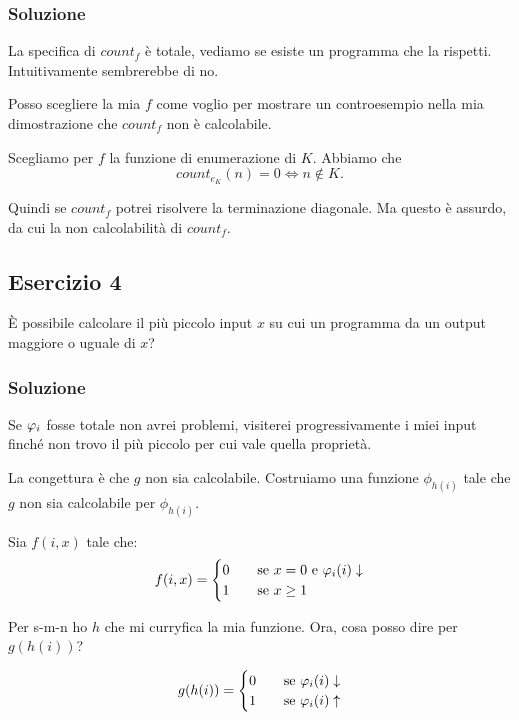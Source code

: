 \subsubsection{Soluzione}

La specifica di $\textit{count}_{f}$ è totale, vediamo se esiste un programma che la rispetti.
Intuitivamente sembrerebbe di no.

Posso scegliere la mia $f$ come voglio per mostrare un controesempio nella mia dimostrazione che
$\textit{count}_{f}$ non è calcolabile.

Scegliamo per $f$ la funzione di enumerazione di $K$. Abbiamo che
\begin{equation*}
    count_{e_{K}}(n) = 0 \iff n \notin K.
\end{equation*}

Quindi se $\textit{count}_{f}$ potrei risolvere la terminazione diagonale. Ma questo è assurdo, da
cui la non calcolabilità di $\textit{count}_{f}$.

\subsection{Esercizio 4}

È possibile  calcolare  il  più  piccolo  input $x$ su cui un programma da un output maggiore o
uguale di $x$?

\subsubsection{Soluzione}

Se $\varphi_{i}$ fosse totale non avrei problemi, visiterei progressivamente i miei input finché non trovo
il più piccolo per cui vale quella proprietà.

La congettura è che $g$ non sia calcolabile. Costruiamo una funzione $\phi_{h(i)}$ tale che $g$ non sia
calcolabile per $\phi_{h(i)}$.

Sia $f(i,x)$ tale che:
\begin{equation*}
    f(i,x) =
    \begin{cases}
        0 \quad &\text{se $x = 0$ e $\varphi_{i}(i) \downarrow$}\\
        1 \quad &\text{se $x \geq 1$}
    \end{cases}
\end{equation*}

Per s-m-n ho $h$ che mi curryfica la mia funzione. Ora, cosa posso dire per $g(h(i))$?

\begin{equation*}
    g(h(i)) =
    \begin{cases}
        0 \quad &\text{se $\varphi_{i}(i) \downarrow$}\\
        1 \quad &\text{se $\varphi_{i}(i) \uparrow$}\\
    \end{cases}
\end{equation*}

